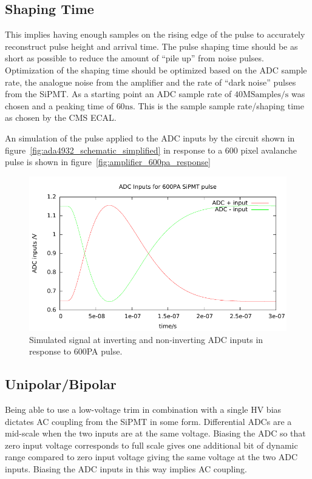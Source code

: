 \documentclass[
12pt, %
a4paper, %
oneside, %
headinclude,footinclude, %
apacite
]{scrartcl}
\begin{document}
\subsection{Shaping Time}

This implies having enough samples on the rising edge of the pulse to accurately reconstruct pulse height and arrival time. The pulse shaping time should be as short as possible to reduce the amount of ``pile up'' from noise pulses. Optimization of the shaping time should be optimized based on the ADC sample rate, the analogue noise from the amplifier and the rate of ``dark noise'' pulses from the SiPMT. As a starting point an ADC sample rate of $40 \mathrm{MSamples/s}$ was chosen and a peaking time of $60\mathrm{ns}$. This is the sample sample rate/shaping time as chosen by the CMS ECAL\cite{1748-0221-5-03-T03011}.

An simulation of the pulse applied to the ADC inputs by the circuit shown in figure~\vref{fig:ada4932_schematic_simplified} in response to a 600 pixel avalanche pulse is shown in figure~\vref{fig:amplifier_600pa_response}

\begin{figure}[tb]
\centering 
\includegraphics[width=\columnwidth]{SiPMT_test_mppc33_ada4932_v8_unipolar.pdf}
\caption[Simulated signal at ADC input for one 600PA pulse]{Simulated signal at inverting and non-inverting ADC inputs in response to 600PA pulse.}
\label{fig:amplifier_600pa_response}
\end{figure}

\subsection{Unipolar/Bipolar}

Being able to use a low-voltage trim in combination with a single HV bias dictates AC coupling from the SiPMT in some form. Differential ADCs are a mid-scale when the two inputs are at the same voltage. Biasing the ADC so that zero input voltage corresponds to full scale gives one additional bit of dynamic range compared to zero input voltage giving the same voltage at the two ADC inputs. Biasing the ADC inputs in this way implies AC coupling.
\end{document}
